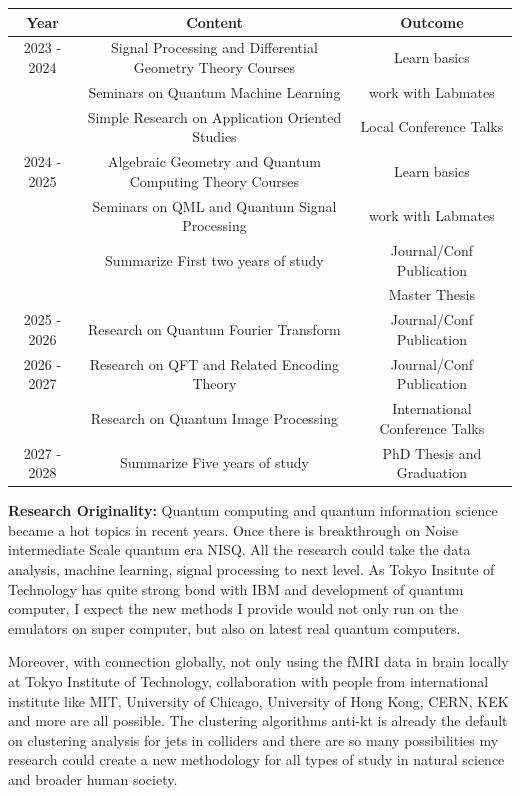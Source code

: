 \documentclass{article}
\begin{document}
\begin{center}
  \begin{tabular}{c|c|c}
    Year & Content & Outcome \\
    \hline
    2023 - 2024 &  Signal Processing and Differential Geometry Theory Courses& Learn basics \\
                &  Seminars on Quantum Machine Learning &  work with Labmates \\
                &  Simple Research on Application Oriented Studies & Local Conference Talks \\ 
    2024 - 2025 &  Algebraic Geometry and Quantum Computing Theory Courses & Learn basics \\
                &  Seminars on QML and Quantum Signal Processing  & work with Labmates \\
                &  Summarize First two years of study & Journal/Conf Publication \\
                & & Master Thesis \\
    \hline
    2025 - 2026 &  Research on Quantum Fourier Transform  & Journal/Conf Publication\\
    2026 - 2027 &  Research on QFT and Related Encoding Theory  & Journal/Conf Publication \\
    & Research on Quantum Image Processing & International Conference Talks \\
    2027 - 2028 &  Summarize Five years of study & PhD Thesis and Graduation 
  \end{tabular}
\end{center}


\textbf{Research Originality:}
Quantum computing and quantum information science became a hot topics in 
recent years. \cite{qml_hep}
Once there is breakthrough on Noise intermediate Scale quantum era NISQ. All 
the research could take the data analysis, machine learning, signal processing 
to next level. As Tokyo Insitute of Technology has quite strong bond with 
IBM and development of quantum computer, I expect the new methods I provide 
would not only run on the emulators on super computer, but also on latest real 
quantum computers.

Moreover, with connection globally, not only using the fMRI data in brain locally 
at Tokyo Institute of Technology, collaboration with people from international 
institute like MIT, University of Chicago, University of Hong Kong, CERN, KEK and 
more are all possible. The clustering algorithms anti-kt is already the 
default on clustering analysis for jets in colliders and there are so 
many possibilities my research could create a new methodology for 
all types of study in natural science and broader human society. 
\end{document}
